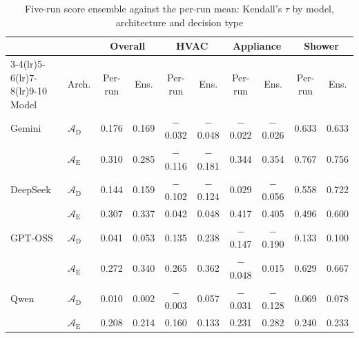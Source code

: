 \begin{table}[htbp]
\centering
\footnotesize
\caption{Five-run score ensemble against the per-run mean: Kendall's $\tau$ by model, architecture and decision type}
\label{tab:score_ensemble}
\renewcommand{\arraystretch}{1.15}
\setlength{\tabcolsep}{3pt}
\begin{tabular}{ll cc cc cc cc}
\toprule
& & \multicolumn{2}{c}{Overall} & \multicolumn{2}{c}{HVAC} & \multicolumn{2}{c}{Appliance} & \multicolumn{2}{c}{Shower} \\
\cmidrule(lr){3-4}\cmidrule(lr){5-6}\cmidrule(lr){7-8}\cmidrule(lr){9-10}
Model & Arch. & Per-run & Ens. & Per-run & Ens. & Per-run & Ens. & Per-run & Ens. \\
\midrule
Gemini & $\mathcal{A}_{\text{D}}$ & 0.176 & 0.169 & $-$0.032 & $-$0.048 & $-$0.022 & $-$0.026 & 0.633 & 0.633 \\
 & $\mathcal{A}_{\text{E}}$ & 0.310 & 0.285 & $-$0.116 & $-$0.181 & 0.344 & 0.354 & 0.767 & 0.756 \\
DeepSeek & $\mathcal{A}_{\text{D}}$ & 0.144 & 0.159 & $-$0.102 & $-$0.124 & 0.029 & $-$0.056 & 0.558 & 0.722 \\
 & $\mathcal{A}_{\text{E}}$ & 0.307 & 0.337 & 0.042 & 0.048 & 0.417 & 0.405 & 0.496 & 0.600 \\
GPT-OSS & $\mathcal{A}_{\text{D}}$ & 0.041 & 0.053 & 0.135 & 0.238 & $-$0.147 & $-$0.190 & 0.133 & 0.100 \\
 & $\mathcal{A}_{\text{E}}$ & 0.272 & 0.340 & 0.265 & 0.362 & $-$0.048 & 0.015 & 0.629 & 0.667 \\
Qwen & $\mathcal{A}_{\text{D}}$ & 0.010 & 0.002 & $-$0.003 & 0.057 & $-$0.031 & $-$0.128 & 0.069 & 0.078 \\
 & $\mathcal{A}_{\text{E}}$ & 0.208 & 0.214 & 0.160 & 0.133 & 0.231 & 0.282 & 0.240 & 0.233 \\
\bottomrule
\end{tabular}
\setlength{\tabcolsep}{6pt}
\renewcommand{\arraystretch}{1.0}
\end{table}

